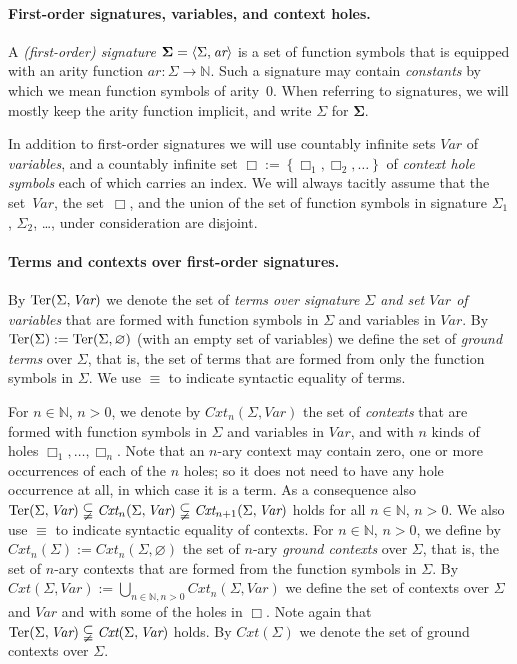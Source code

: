 \documentclass[
submission
]{dmtcs-episciences-tampered}
\newcommand{\funin}{\mathrel{:}}
\newcommand{\fap}[2]{#1({#2})}
\newcommand{\iap}[2]{#1 _{#2}}
\newcommand{\indap}[2]{#1 _{#2}}
\newcommand{\subap}[2]{#1 _{#2}}
\newcommand{\bap}{\subap}
\newcommand{\nb}{\nobreakdash}
\newcommand{\nf}{\normalfont}
\newcommand{\sdefdby}{{:=}}
\newcommand{\defdby}{\mathrel{\sdefdby}}
\newcommand{\tuple}[1]{\langle #1 \rangle}
\newcommand{\tuplespace}{\hspace*{0.5pt}}
\newcommand{\pair}[2]{\tuple{#1, \tuplespace #2}}
\newcommand{\setexp}[1]{\left\{{#1}\right\}}
\renewcommand{\emptyset}{\varnothing}
\newcommand{\nat}{\mathbb{N}}
\newcommand{\asig}{\Sigma}
\newcommand{\asigi}{\indap{\asig}}
\newcommand{\stermsover}{\text{\nf Ter}}
\newcommand{\termsover}{\fap{\stermsover}}
\newcommand{\scontextsover}{\textit{Cxt}}
\newcommand{\contextsover}{\fap{\scontextsover}}
\newcommand{\scontextsnover}{\bap{\scontextsover}}
\newcommand{\contextsnover}[1]{\fap{\scontextsnover{#1}}}
\newcommand{\sarity}{\textit{ar}}
\newcommand{\vars}{\textit{Var}}
\newcommand{\hole}{\Box}
\newcommand{\holei}{\iap{\hole}}
\newcommand{\holes}{\pmb{\hole}}
\newcommand{\nary}[1]{{$#1$}\nb-ary}
\newcommand{\ssyntequal}{{\equiv}}
\newcommand{\syntequal}{\mathrel{\ssyntequal}}
\theoremstyle{plain}
\theoremstyle{definition}
\begin{document}
\paragraph{First-order signatures, variables, and context holes.}
  A \emph{(first-order) signature} $\boldsymbol{\asig} = \pair{\asig}{\sarity}$ is a set of function symbols that is equipped with an arity function $\sarity \funin \asig \to \nat$. 
  Such a signature may contain \emph{constants} by which we mean function symbols of arity~$0$. 
  When referring to signatures, we will mostly keep the arity function implicit, and write $\asig$ for $\boldsymbol{\asig}$. 
  
  In addition to first-order signatures we will use
  countably infinite sets $\vars$ of \emph{variables},
  and a countably infinite set $\holes \defdby \setexp{ \holei{1},\holei{2},\ldots }$ of \emph{context hole symbols}
  each of which carries an index.
  We will always tacitly assume that the set~$\vars$, the set~$\holes$, 
  and the union of the set of function symbols in signature $\asigi{1}$, $\asigi{2}$, \ldots, under consideration
  are disjoint.
  
  
  
\paragraph{Terms and contexts over first-order signatures.}   
  By $\termsover{\asig,\vars}$ we denote the set of \emph{terms over signature $\asig$ and set $\vars$ of variables} 
  that are formed with function symbols in $\asig$ and variables in $\vars$.
  By $\termsover{\asig} \defdby \termsover{\asig,\emptyset}$ (with an empty set of variables) we define 
  the set of \emph{ground terms} over $\asig$,
  that is, the set of terms that are formed from only the function symbols in $\asig$.
  We use $\syntequal$ to indicate syntactic equality of terms.
  
  For $n\in\nat$, $n>0$,  we denote by $\contextsnover{n}{\asig,\vars}$ the set of \emph{contexts} 
  that are formed with function symbols in $\asig$ and variables in $\vars$,
  and with $n$ kinds of holes $\holei{1},\ldots,\holei{n}$.
  Note that an \nary{n} context may contain zero, one or more occurrences of each of the $n$ holes;
  so it does not need to have any hole occurrence at all, in which case it is a term.
  As a consequence also $\termsover{\asig,\vars} \subsetneqq \contextsnover{n}{\asig,\vars} \subsetneqq \contextsnover{n+1}{\asig,\vars}$ holds for all $n\in\nat$, $n>0$.
  We also use $\syntequal$ to indicate syntactic equality of contexts.
For $n\in\nat$, $n>0$, we define by $\contextsnover{n}{\asig} \defdby \contextsnover{n}{\asig,\emptyset}$  
  the set of \nary{n} \emph{ground contexts} over $\asig$,
  that is, the set of \nary{n} contexts that are formed from the function symbols in $\asig$.
By $\contextsover{\asig,\vars} \defdby \bigcup_{n\in\nat, n>0} \contextsnover{n}{\asig,\vars}$
  we define the set of contexts over $\asig$ and $\vars$ and with some of the holes in $\holes$.
  Note again that $\termsover{\asig,\vars} \subsetneqq \contextsover{\asig,\vars}$ holds.
  By $\contextsover{\asig}$ we denote the set of ground contexts over $\asig$. 
  
\end{document}
